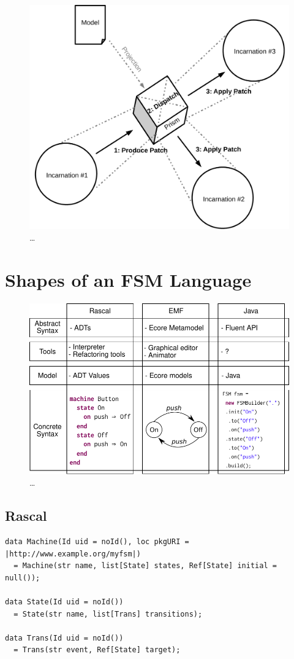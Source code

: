 \documentclass[sigplan]{acmart}
\begin{document}
\begin{figure}
	\centering
	\includegraphics[width=.6\columnwidth]{figures/prism}
	\caption{\dots}
	\label{fig:prism}
\end{figure}

\section{Shapes of an FSM Language}

\begin{figure}
	\centering
	\includegraphics[width=\columnwidth]{figures/concepts-instantiated}
	\caption{\dots}
	\label{fig:concepts-instantiated}
\end{figure}

\subsection{Rascal}
\begin{minipage}{\columnwidth}
\begin{lstlisting}[label=lst:fsm-adt, caption={FSM in Rascal}, language=Rascal]
data Machine(Id uid = noId(), loc pkgURI = |http://www.example.org/myfsm|)
  = Machine(str name, list[State] states, Ref[State] initial = null());

data State(Id uid = noId())
  = State(str name, list[Trans] transitions);

data Trans(Id uid = noId())
  = Trans(str event, Ref[State] target);
\end{lstlisting}
\end{minipage}
\end{document}
